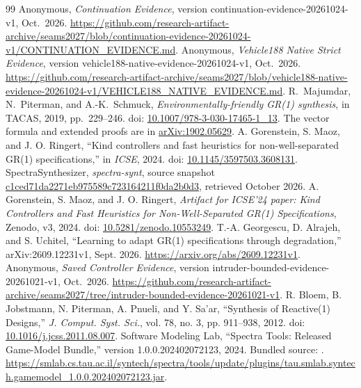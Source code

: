 \documentclass[11pt]{article}
\begin{document}
\begin{thebibliography}{99}
Anonymous, \emph{Continuation Evidence}, version continuation-evidence-20261024-v1, Oct.~2026. \url{https://github.com/research-artifact-archive/seams2027/blob/continuation-evidence-20261024-v1/CONTINUATION_EVIDENCE.md}.
Anonymous, \emph{Vehicle188 Native Strict Evidence}, version vehicle188-native-evidence-20261024-v1, Oct.~2026. \url{https://github.com/research-artifact-archive/seams2027/blob/vehicle188-native-evidence-20261024-v1/VEHICLE188_NATIVE_EVIDENCE.md}.
 R.~Majumdar, N.~Piterman, and A.-K.~Schmuck, \emph{Environmentally-friendly GR(1) synthesis}, in TACAS, 2019, pp.~229--246. doi: \href{https://doi.org/10.1007/978-3-030-17465-1_13}{10.1007/978-3-030-17465-1\_13}. The vector formula and extended proofs are in \href{https://arxiv.org/abs/1902.05629}{arXiv:1902.05629}.
 A. Gorenstein, S. Maoz, and J. O. Ringert, ``Kind controllers and fast heuristics for non-well-separated GR(1) specifications,'' in \emph{ICSE}, 2024. doi: \href{https://doi.org/10.1145/3597503.3608131}{10.1145/3597503.3608131}.
 SpectraSynthesizer, \emph{spectra-synt}, source snapshot \href{https://github.com/SpectraSynthesizer/spectra-synt/tree/c1ced71da2271eb975589c723164211f0da2b0d3}{c1ced71da2271eb975589c723164211f0da2b0d3}, retrieved October 2026.
 A. Gorenstein, S. Maoz, and J. O. Ringert, \emph{Artifact for ICSE'24 paper: Kind Controllers and Fast Heuristics for Non-Well-Separated GR(1) Specifications}, Zenodo, v3, 2024. doi: \href{https://doi.org/10.5281/zenodo.10553249}{10.5281/zenodo.10553249}.
 T.-A. Georgescu, D. Alrajeh, and S. Uchitel, ``Learning to adapt GR(1) specifications through degradation,'' arXiv:2609.12231v1, Sept. 2026. \url{https://arxiv.org/abs/2609.12231v1}.
 Anonymous, \emph{Saved Controller Evidence}, version intruder-bounded-evidence-20261021-v1, Oct.~2026. \url{https://github.com/research-artifact-archive/seams2027/tree/intruder-bounded-evidence-20261021-v1}.
R. Bloem, B. Jobstmann, N. Piterman, A. Pnueli, and Y. Sa'ar, ``Synthesis of Reactive(1) Designs,'' \emph{J. Comput. Syst. Sci.}, vol. 78, no. 3, pp. 911--938, 2012. doi: \href{https://doi.org/10.1016/j.jcss.2011.08.007}{10.1016/j.jcss.2011.08.007}.
Software Modeling Lab, ``Spectra Tools: Released Game-Model Bundle,'' version 1.0.0.202402072123, 2024. Bundled source: . \url{https://smlab.cs.tau.ac.il/syntech/spectra/tools/update/plugins/tau.smlab.syntech.gamemodel_1.0.0.202402072123.jar}.

\end{thebibliography}
\end{document}
